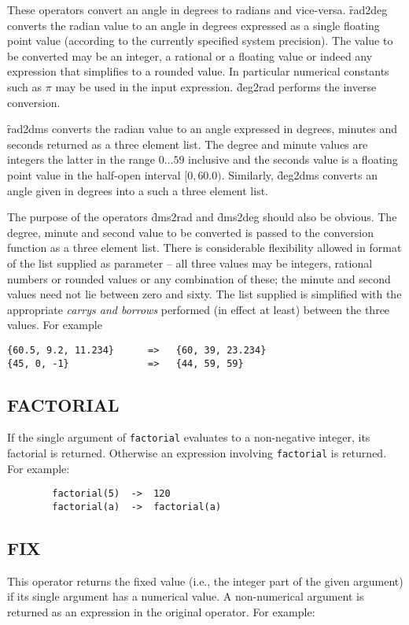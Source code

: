 These operators convert an angle in degrees to radians and vice-versa.
\f{rad2deg} converts the radian value to  an angle in degrees expressed as a single floating point value (according to the currently specified system precision).
The value to be converted may be an integer, a rational or a floating value or indeed any expression that simplifies to a rounded value.
In particular  numerical constants such as $\pi$ may be used in the input expression.
\f{deg2rad} performs the inverse conversion.

\f{rad2dms} converts the radian value to an angle expressed in degrees, minutes and seconds returned as a three element list.  The degree and minute values are integers the latter in the range $0 \ldots 59$ inclusive and the seconds value is  a floating point value in the half-open interval $[0, 60.0)$.
Similarly, \f{deg2dms} converts an angle given in degrees into a such a three element list.

The purpose of the operators  \f{dms2rad} and \f{dms2deg} should  also be obvious.  The degree, minute and second value to be converted is passed to the conversion function as a three element list.  There is considerable flexibility allowed in  format of the list supplied as parameter -- all three values may be integers, rational numbers or rounded values or any combination of these; the minute and second values need not lie between zero and sixty.  The list supplied is simplified with the appropriate \textit{carrys and borrows} performed (in effect at least) between the three values.  For example
\begin{verbatim}
{60.5, 9.2, 11.234}      =>   {60, 39, 23.234}
{45, 0, -1}              =>   {44, 59, 59}
\end{verbatim}

\subsection{FACTORIAL}
\hypertarget{operator:FACTORIAL}{}

If the single argument of \texttt{factorial} evaluates to a non-negative
integer, its factorial is returned.  Otherwise an expression involving
\texttt{factorial} is returned. For example:
\begin{verbatim}
        factorial(5)  ->  120
        factorial(a)  ->  factorial(a)
\end{verbatim}

\subsection{FIX}
\hypertarget{operator:FIX}{}
This operator returns the fixed value (i.e., the integer part of
the given argument) if its single argument has a numerical value.  A
non-numerical argument is returned as an expression in the original
operator.  For example:


